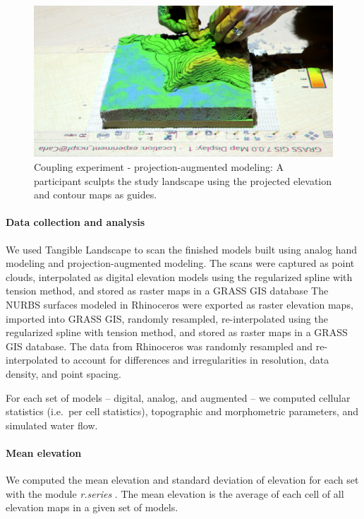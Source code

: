 \documentclass[prodmode,acmtochi]{acmsmall} %
\begin{document}
\begin{figure}
\begin{center}
	\includegraphics[width=\textwidth]{images/experiments/carla_proj_aug.jpg}
	\caption{Coupling experiment - projection-augmented modeling:
	A participant sculpts the study landscape using
	the projected elevation and contour maps
	as guides.}
	\label{fig:proj_aug}
\end{center}
\end{figure}

\paragraph{Data collection and analysis}
We used Tangible Landscape to scan the finished models 
built using analog hand modeling and projection-augmented modeling.
The scans were captured as point clouds, interpolated 
as digital elevation models using the regularized spline with tension method,
and stored as raster maps in a GRASS GIS database 
The NURBS surfaces modeled in Rhinoceros were exported as raster elevation maps,
imported into GRASS GIS, randomly resampled, 
re-interpolated using the regularized spline with tension method, 
and stored as raster maps in a GRASS GIS database. 
The data from Rhinoceros was randomly resampled and re-interpolated
to account for differences and irregularities in resolution, data density, and point spacing.

For each set of models -- digital, analog, and augmented --
we computed cellular statistics (i.e.~per cell statistics), 
topographic and morphometric parameters, 
and simulated water flow.

\paragraph{Mean elevation}
We computed 
the mean elevation 
and standard deviation of elevation
for each set
with the module \textit{r.series} \cite{r.series}.
The mean elevation is the average of each cell 
of all elevation maps in a given set of models.
\end{document}
